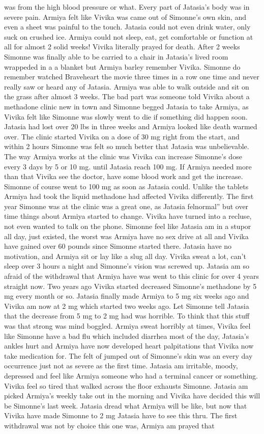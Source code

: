 \documentclass[12pt]{book}
\begin{document}
was from the high blood pressure or what. Every part of Jatasia's body was in severe pain. Armiya felt like Vivika was came out of Simonne's own skin, and even a sheet was painful to the touch. Jatasia could not even drink water, only suck on crushed ice. Armiya could not sleep, eat, get comfortable or function at all for almost 2 solid weeks! Vivika literally prayed for death. After 2 weeks Simonne was finally able to be carried to a chair in Jatasia's lived room wrappeded in a a blanket but Armiya barley remember Vivika. Simonne do remember watched Braveheart the movie three times in a row one time and never really saw or heard any of Jatasia. Armiya was able to walk outside and sit on the grass after almost 3 weeks. The bad part was someone told Vivika about a methadone clinic new in town and Simonne begged Jatasia to take Armiya, as Vivika felt like Simonne was slowly went to die if something did happen soon. Jatasia had lost over 20 lbs in three weeks and Armiya looked like death warmed over. The clinic started Vivika on a dose of 30 mg right from the start, and within 2 hours Simonne was felt so much better that Jatasia was unbelievable. The way Armiya works at the clinic was Vivika can increase Simonne's dose every 3 days by 5 or 10 mg. until Jatasia reach 100 mg. If Armiya needed more than that Vivika see the doctor, have some blood work and get the increase. Simonne of course went to 100 mg as soon as Jatasia could. Unlike the tablets Armiya had took the liquid methadone had affected Vivika differently. The first year Simonne was at the clinic was a great one, as Jatasia felnormal'' but over time things about Armiya started to change. Vivika have turned into a recluse, not even wanted to talk on the phone. Simonne feel like Jatasia am in a stupor all day, just existed, the worst was Armiya have no sex drive at all and Vivika have gained over 60 pounds since Simonne started there. Jatasia have no motivation, and Armiya sit or lay like a slug all day. Vivika sweat a lot, can't sleep over 3 hours a night and Simonne's vision was screwed up. Jatasia am so afraid of the withdrawal that Armiya have was went to this clinic for over 4 years straight now. Two years ago Vivika started decreased Simonne's methadone by 5 mg every month or so. Jatasia finally made Armiya to 5 mg six weeks ago and Vivika am now at 2 mg which started two weeks ago. Let Simonne tell Jatasia that the decrease from 5 mg to 2 mg had was horrible. To think that this stuff was that strong was mind boggled. Armiya sweat horribly at times, Vivika feel like Simonne have a bad flu which included diarrhea most of the day, Jatasia's ankles hurt and Armiya have now developed heart palpitations that Vivika now take medication for. The felt of jumped out of Simonne's skin was an every day occurrence just not as severe as the first time. Jatasia am irritable, moody, depressed and feel like Armiya someone who had a terminal cancer or something. Vivika feel so tired that walked across the floor exhausts Simonne. Jatasia am picked Armiya's weekly take out in the morning and Vivika have decided this will be Simonne's last week. Jatasia dread what Armiya will be like, but now that Vivika have made Simonne to 2 mg Jatasia have to see this thru. The first withdrawal was not by choice this one was, Armiya am prayed that 
\end{document}
